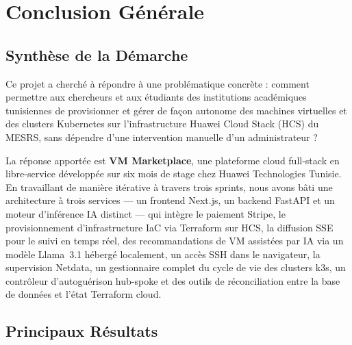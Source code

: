 \chapter*{Conclusion Générale}

\section*{Synthèse de la Démarche}

Ce projet a cherché à répondre à une problématique concrète : comment permettre aux
chercheurs et aux étudiants des institutions académiques tunisiennes de provisionner
et gérer de façon autonome des machines virtuelles et des clusters Kubernetes sur
l'infrastructure Huawei Cloud Stack (HCS) du MESRS, sans dépendre d'une intervention
manuelle d'un administrateur ?

La réponse apportée est \textbf{VM Marketplace}, une plateforme cloud full-stack en
libre-service développée sur six mois de stage chez Huawei Technologies Tunisie.
En travaillant de manière itérative à travers trois sprints, nous avons bâti une
architecture à trois services --- un frontend Next.js, un backend FastAPI et un moteur
d'inférence IA distinct --- qui intègre le paiement Stripe, le provisionnement
d'infrastructure IaC via Terraform sur HCS, la diffusion SSE pour le suivi en temps
réel, des recommandations de VM assistées par IA via un modèle Llama~3.1 hébergé
localement, un accès SSH dans le navigateur, la supervision Netdata, un gestionnaire
complet du cycle de vie des clusters k3s, un contrôleur d'autoguérison hub-spoke et
des outils de réconciliation entre la base de données et l'état Terraform cloud.

\section*{Principaux Résultats}

